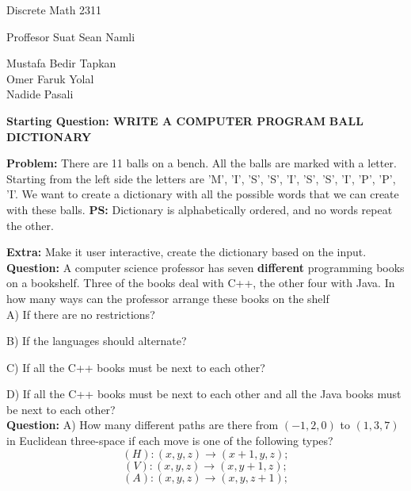 \documentclass[11pt]{article}
\begin{document}
\begin{center}
Discrete Math 2311
\end{center}

\begin{center}
Proffesor Suat Sean Namli\\
\end{center}

\begin{center}
Mustafa Bedir Tapkan\\
Omer Faruk Yolal\\
Nadide Pasali\\
\end{center}

\newpage

\textbf{Starting Question: WRITE A COMPUTER PROGRAM} 
\textbf{BALL DICTIONARY}

\textbf{Problem:} There are 11 balls on a bench. All the balls are marked with a letter. 
Starting from the left side the letters are 'M', 'I', 'S', 'S', 'I', 'S', 'S', 'I', 'P', 'P', 'I'. We want to 
create a dictionary with all the possible words that we can create with these balls. %
 \textbf{PS:} Dictionary is alphabetically ordered, and no words repeat the other. %

\textbf{Extra:} Make it user interactive, create the dictionary based on the input.
\\

\textbf{Question:}  A computer science professor has seven \textbf{different} programming 
books on a bookshelf. Three of the books deal with C++, the other four with Java. In how 
many ways can the professor arrange these books on the shelf\\  %

A) If there are no restrictions?

B) If the languages should alternate?

C) If all the C++ books must be next to each other?

D) If all the C++ books must be next to each other and all the Java books must be next to each other?
\\

\textbf{Question:}  A) How many different paths are there from $(-1,2,0)$ to $(1,3,7)$ in Euclidean three-space if each move is one of the following types? %
$$(H):(x,y,z)\rightarrow(x+1,y,z);$$
$$(V):(x,y,z)\rightarrow(x,y+1,z);$$
$$(A):(x,y,z)\rightarrow(x,y,z+1);$$
\end{document}
